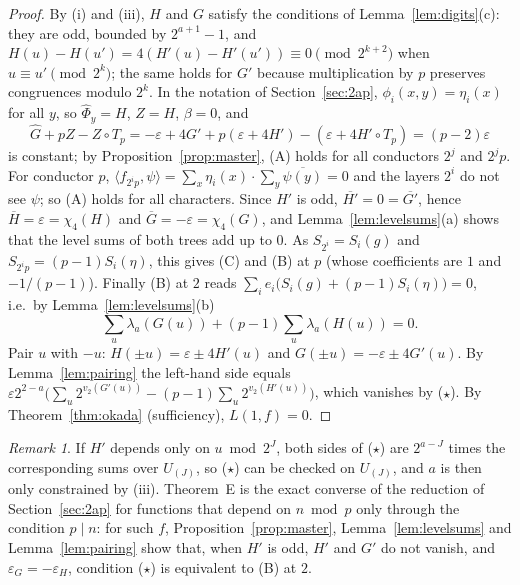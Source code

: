 \documentclass[11pt,a4paper]{article}
\theoremstyle{definition}
\theoremstyle{remark}
\newtheorem{remark}[theorem]{Remark}
\newcommand{\ip}[2]{\langle #1,#2\rangle}
\newcommand{\Ga}{\widehat G}
\newcommand{\Ph}{\widehat\Phi}
\newcommand{\Uu}[1]{U_{(#1)}}
\begin{document}
\begin{proof}
By (i) and (iii), $H$ and $G$ satisfy the conditions of Lemma~\ref{lem:digits}(c): they are odd, bounded by $2^{a+1}-1$, and $H(u)-H(u')=4(H'(u)-H'(u'))\equiv0\pmod{2^{k+2}}$ when $u\equiv u'\pmod{2^k}$; the same holds for $G'$ because multiplication by $p$ preserves congruences modulo $2^k$. In the notation of Section~\ref{sec:2ap}, $\phi_i(x,y)=\eta_i(x)$ for all $y$, so $\Ph_y=H$, $Z=H$, $\beta=0$, and
\[
\Ga+pZ-Z\circ T_p=-\varepsilon+4G'+p(\varepsilon+4H')-(\varepsilon+4H'\circ T_p)=(p-2)\varepsilon
\]
is constant; by Proposition~\ref{prop:master}, (A) holds for all conductors $2^j$ and $2^jp$. For conductor $p$, $\ip{f_{2^ip}}{\psi}=\sum_x\eta_i(x)\cdot\sum_y\overline{\psi(y)}=0$ and the layers $2^i$ do not see $\psi$; so (A) holds for all characters. Since $H'$ is odd, $\overline{H'}=0=\overline{G'}$, hence $\overline H=\varepsilon=\chi_4(H)$ and $\overline G=-\varepsilon=\chi_4(G)$, and Lemma~\ref{lem:levelsums}(a) shows that the level sums of both trees add up to $0$. As $S_{2^i}=S_i(g)$ and $S_{2^ip}=(p-1)S_i(\eta)$, this gives (C) and (B) at $p$ (whose coefficients are $1$ and $-1/(p-1)$). Finally (B) at $2$ reads $\sum_ie_i\bigl(S_i(g)+(p-1)S_i(\eta)\bigr)=0$, i.e.\ by Lemma~\ref{lem:levelsums}(b)
\[
\sum_{u}\lambda_a(G(u))+(p-1)\sum_u\lambda_a(H(u))=0 .
\]
Pair $u$ with $-u$: $H(\pm u)=\varepsilon\pm4H'(u)$ and $G(\pm u)=-\varepsilon\pm4G'(u)$. By Lemma~\ref{lem:pairing} the left-hand side equals $\varepsilon2^{2-a}\bigl(\sum_u2^{v_2(G'(u))}-(p-1)\sum_u2^{v_2(H'(u))}\bigr)$, which vanishes by ($\star$). By Theorem~\ref{thm:okada} (sufficiency), $L(1,f)=0$.
\end{proof}

\begin{remark}
If $H'$ depends only on $u\bmod2^J$, both sides of ($\star$) are $2^{a-J}$ times the corresponding sums over $\Uu J$, so ($\star$) can be checked on $\Uu J$, and $a$ is then only constrained by (iii). Theorem~E is the exact converse of the reduction of Section~\ref{sec:2ap} for functions that depend on $n\bmod p$ only through the condition $p\mid n$: for such $f$, Proposition~\ref{prop:master}, Lemma~\ref{lem:levelsums} and Lemma~\ref{lem:pairing} show that, when $H'$ is odd, $H'$ and $G'$ do not vanish, and $\varepsilon_G=-\varepsilon_H$, condition ($\star$) is equivalent to (B) at $2$.
\end{remark}
\end{document}
